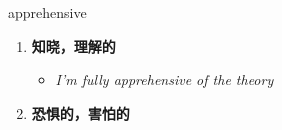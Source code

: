 
\begin{frame}
{\huge apprehensive}
\begin{center}
\begin{enumerate}\Large
  \item \textbf{知晓，理解的}
  \begin{itemize}
    \item \em{\Large{I'm fully apprehensive of the theory}}
  \end{itemize}
  \item \textbf{恐惧的，害怕的}
\end{enumerate}
\end{center}
\end{frame}

